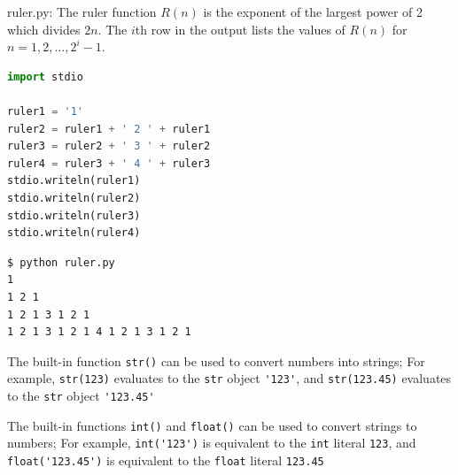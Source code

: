 \documentclass[8pt,a4paper,compress]{beamer}
\begin{document}
\begin{frame}[fragile]
\pause

\begin{framed}
\tiny ruler.py: The ruler function $R(n)$ is the exponent of the largest power of 2 which 
divides $2n$. The $i$th row in the output lists the values of $R(n)$ for $n=1,2,
\dots,2^i-1$.
\end{framed}

\begin{lstlisting}[language=Python]
import stdio

ruler1 = '1'
ruler2 = ruler1 + ' 2 ' + ruler1
ruler3 = ruler2 + ' 3 ' + ruler2
ruler4 = ruler3 + ' 4 ' + ruler3
stdio.writeln(ruler1)
stdio.writeln(ruler2)
stdio.writeln(ruler3)
stdio.writeln(ruler4)
\end{lstlisting}

\pause

\begin{lstlisting}[language={}]
$ python ruler.py 
1
1 2 1
1 2 1 3 1 2 1
1 2 1 3 1 2 1 4 1 2 1 3 1 2 1
\end{lstlisting}
\end{frame}

\begin{frame}[fragile]
\pause

The built-in function \lstinline{str()} can be used to convert numbers into strings; For example, \lstinline{str(123)} evaluates to the \lstinline{str} object \lstinline{'123'}, and \lstinline{str(123.45)} evaluates to the \lstinline{str} object \lstinline{'123.45'}

\pause
\bigskip

The built-in functions \lstinline{int()} and \lstinline{float()} can be used to convert strings to numbers; For example, \lstinline{int('123')} is equivalent to the \lstinline{int} literal \lstinline{123}, and \lstinline{float('123.45')} is equivalent to the \lstinline{float} literal \lstinline{123.45}
\end{frame}
\end{document}
